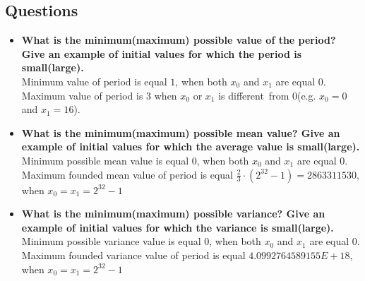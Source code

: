 \documentclass[a4paper,10pt]{article}
\begin{document}
\subsection{Questions}
\begin{itemize}
 \item \textbf{What is the minimum(maximum) possible value of the period? Give an example of initial values for which the period is small(large).} \\
Minimum value of period is equal $1$, when both $x_0$ and $x_1$ are equal $0$. Maximum value of period is $3$ when $x_0$ or $x_1$ is different from 0(e.g. $x_0 = 0$ and $x_1 = 16$).

 \item \textbf{What is the minimum(maximum) possible mean value? Give an example of initial values for which the average value is small(large).} \\
Minimum possible mean value is equal $0$, when both $x_0$ and $x_1$ are equal $0$. Maximum founded mean value of period is equal $\frac{2}{3} \cdot (2^{32} - 1) = 2863311530$, when $x_0 = x_1 = 2^{32} -1$

 \item \textbf{What is the minimum(maximum) possible variance? Give an example of initial values for which the variance is small(large).} \\
Minimum possible variance value is equal $0$, when both $x_0$ and $x_1$ are equal $0$. Maximum founded variance value of period is equal $4.0992764589155E+18$, when $x_0 = x_1 = 2^{32} -1$


\end{itemize}
\end{document}
